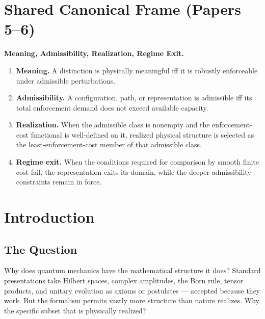 \documentclass[11pt]{article}
\begin{document}
\section*{Shared Canonical Frame (Papers 5--6)}

\begin{apfbox}
\textbf{Meaning, Admissibility, Realization, Regime Exit.}
\begin{enumerate}[leftmargin=1.6em]
    \item \textbf{Meaning.} A distinction is physically meaningful iff it is robustly
    enforceable under admissible perturbations.
    \item \textbf{Admissibility.} A configuration, path, or representation is
    admissible iff its total enforcement demand does not exceed available capacity.
    \item \textbf{Realization.} When the admissible class is nonempty and the
    enforcement-cost functional is well-defined on it, realized physical structure
    is selected as the least-enforcement-cost member of that admissible class.
    \item \textbf{Regime exit.} When the conditions required for comparison by
    smooth finite cost fail, the representation exits its domain, while the deeper
    admissibility constraints remain in force.
\end{enumerate}
\end{apfbox}

\section{Introduction}

\subsection{The Question}
Why does quantum mechanics have the mathematical structure it does? Standard
presentations take Hilbert spaces, complex amplitudes, the Born rule, tensor
products, and unitary evolution as axioms or postulates --- accepted because they
work. But the formalism permits vastly more structure than nature realizes. Why the
specific subset that is physically realized?
\end{document}
